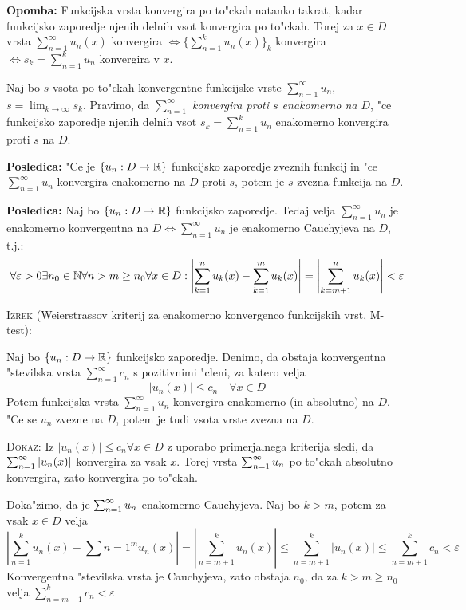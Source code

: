 \textbf{Opomba:} Funkcijska vrsta konvergira po to"ckah natanko takrat, kadar funkcijsko zaporedje njenih delnih vsot konvergira po to"ckah. Torej za $x \in D$ vrsta $\sum_{n=1}^\infty u_n(x)$ konvergira $\iff \{ \sum_{n=1}^k u_n (x) \}_k$ konvergira $\iff s_k = \sum_{n=1}^k u_n$ konvergira v $x$.

Naj bo $s$ vsota po to"ckah konvergentne funkcijske vrste $\sum_{n=1}^\infty u_n$, $s = \lim_{k \to \infty} s_k$. Pravimo, da $\sum_{n=1}^\infty$ \emph{konvergira proti $s$ enakomerno na $D$}, "ce funkcijsko zaporedje njenih delnih vsot $s_k = \sum_{n=1}^k u_n$ enakomerno konvergira proti $s$ na $D$.

\textbf{Posledica:} "Ce je $\{ u_n: D \to \mathbb{R} \}$ funkcijsko zaporedje zveznih funkcij in "ce $\sum_{n=1}^\infty u_n$ konvergira enakomerno na $D$ proti $s$, potem je $s$ zvezna funkcija na $D$.

\textbf{Posledica:} Naj bo $\{ u_n : D \to \mathbb{R} \}$ funkcijsko zaporedje. Tedaj velja $\sum_{n=1}^\infty u_n$ je enakomerno konvergentna na $D \iff \sum_{n=1}^\infty u_n$ je enakomerno Cauchyjeva na $D$, t.j.:
\begin{equation*}
\forall \varepsilon > 0 \exists n_0 \in \mathbb{N} \forall n > m \geq n_0 \forall x \in D: \left| \sum_{k=1}^n u_k(x) - \sum_{k=1}^m u_k(x) \right| = \left| \sum_{k = m+1}^n u_k(x) \right| < \varepsilon
\end{equation*}

\textsc{Izrek} (Weierstrassov kriterij za enakomerno konvergenco funkcijskih vrst, M-test):

Naj bo $\{ u_n : D \to \mathbb{R} \}$ funkcijsko zaporedje. Denimo, da obstaja konvergentna "stevilska vrsta $\sum_{n=1}^\infty c_n$ s pozitivnimi "cleni, za katero velja
\begin{equation*}
|u_n(x)| \leq c_n \quad \forall x \in D
\end{equation*}
Potem funkcijska vrsta $\sum_{n=1}^\infty u_n$ konvergira enakomerno (in absolutno) na $D$. "Ce se $u_n$ zvezne na $D$, potem je tudi vsota vrste zvezna na $D$.

\textsc{Dokaz:} Iz $|u_n(x)| \leq c_n \forall x \in D$ z uporabo primerjalnega kriterija sledi, da $\sum_{n = 1}^{\infty} |u_n(x)|$ konvergira za vsak $x$. Torej vrsta $\sum_{n = 1}^{\infty} u_n$ po to"ckah absolutno konvergira, zato konvergira po to"ckah.

Doka"zimo, da je $\sum_{n = 1}^{\infty} u_n$ enakomerno Cauchyjeva. Naj bo $k > m$, potem za vsak $x \in D$ velja
\begin{equation*}
\left| \sum_{n=1}^ku_n(x) - \sum{n=1}^m u_n(x) \right| = \left| \sum_{n= m+1}^{k} u_n(x) \right| \leq
 \sum_{n = m+1}^k |u_n(x)| \leq \sum_{n = m+1}^k c_n < \varepsilon
\end{equation*}
Konvergentna "stevilska vrsta je Cauchyjeva, zato obstaja $n_0$, da za $k > m \geq n_0$ velja $\sum_{n = m+1}^k c_n < \varepsilon$
